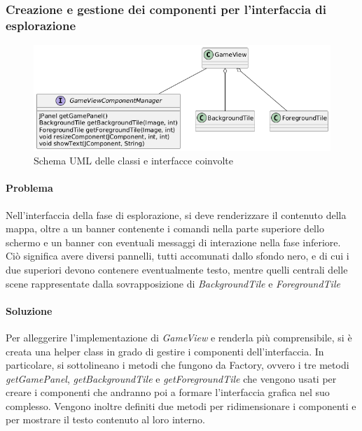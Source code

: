 \documentclass[a4paper,12pt]{report}
\begin{document}
\subsubsection{Creazione e gestione dei componenti per l'interfaccia di esplorazione}
\begin{figure}[H]
	\centering
	\includegraphics[width=\textwidth]{img/factory-gameview.png}
	\caption{Schema UML delle classi e interfacce coinvolte}
	\label{img:factory-gameview}
\end{figure}
\paragraph{Problema} Nell'interfaccia della fase di esplorazione, si deve renderizzare il contenuto della mappa, oltre a un banner contenente i comandi nella parte superiore dello schermo e un banner con eventuali messaggi di interazione nella fase inferiore. Ciò significa avere diversi pannelli, tutti accomunati dallo sfondo nero, e di cui i due superiori devono contenere eventualmente testo, mentre quelli centrali delle scene rappresentate dalla sovrapposizione di \textit{BackgroundTile} e \textit{ForegroundTile}
\paragraph{Soluzione} Per alleggerire l'implementazione di \textit{GameView} e renderla più comprensibile, si è creata una helper class in grado di gestire i componenti dell'interfaccia. In particolare, si sottolineano i metodi che fungono da Factory, ovvero i tre metodi \textit{getGamePanel}, \textit{getBackgroundTile} e \textit{getForegroundTile} che vengono usati per creare i componenti che andranno poi a formare l'interfaccia grafica nel suo complesso. Vengono inoltre definiti due metodi per ridimensionare i componenti e per mostrare il testo contenuto al loro interno.
\end{document}
